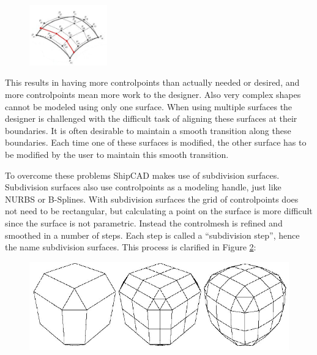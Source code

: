 \documentclass[12pt]{article}
\begin{document}
\begin{figure}
        \centering
        \includegraphics[width=0.3\textwidth,natwidth=300,natheight=233]{figure3.png}
        \caption{}
        \label{fig:mesh2}
\end{figure}

This results in having more controlpoints than actually needed or
desired, and more controlpoints mean more work to the designer. Also
very complex shapes cannot be modeled using only one surface. When
using multiple surfaces the designer is challenged with the difficult
task of aligning these surfaces at their boundaries. It is often
desirable to maintain a smooth transition along these boundaries. Each
time one of these surfaces is modified, the other surface has to be
modified by the user to maintain this smooth transition.

To overcome these problems ShipCAD makes use of subdivision
surfaces. Subdivision surfaces also use controlpoints as a modeling
handle, just like NURBS or B-Splines. With subdivision surfaces the
grid of controlpoints does not need to be rectangular, but calculating
a point on the surface is more difficult since the surface is not
parametric. Instead the controlmesh is refined and smoothed in a
number of steps. Each step is called a “subdivision step”, hence the
name subdivision surfaces. This process is clarified in
Figure \ref{fig:mesh3}:

\begin{figure}[h]
        \centering
        \includegraphics[width=15cm,natwidth=697,natheight=238]{figure4.png}
        \caption{}
        \label{fig:mesh3}
\end{figure}
\end{document}

